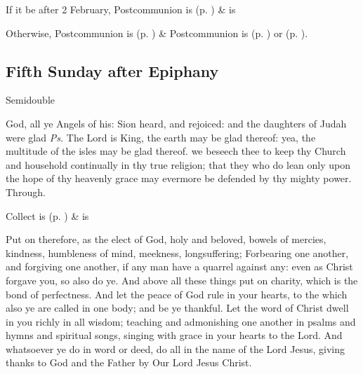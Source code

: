 
\begin{rubric}
    If it be after 2 February,  Postcommunion is  (p. \pageref{SPSaints}) \&  is 
\end{rubric}
\begin{rubric}
	Otherwise,  Postcommunion is  (p. \pageref{SPMaryPostChristmas}) \&  Postcommunion is  (p. \pageref{SPAgainst}) or  (p. \pageref{SPChiefBishop}).
\end{rubric}


\subsection{Fifth Sunday after Epiphany}\label{EpiphanyV}
\begin{inhead}
{Semidouble}
\end{inhead}


\introit
{} God, all ye Angels of his: Sion heard, and rejoiced: and the daughters of Judah were glad \textit{Ps.} The Lord is King, the earth may be glad thereof: yea, the multitude of the isles may be glad thereof.
\collect\label{EpiphanyVCollect}
 we beseech thee to keep thy Church and household continually in thy true religion; that they who do lean only upon the hope of thy heavenly grace may evermore be defended by thy mighty power. Through.
\begin{rubric}
     Collect is  (p. \pageref{SPSaints}) \&  is 
\end{rubric}
 Put on therefore, as the elect of God, holy and beloved, bowels of mercies, kindness, humbleness of mind, meekness, longsuffering; Forbearing one another, and forgiving one another, if any man have a quarrel against any: even as Christ forgave you, so also do ye. And above all these things put on charity, which is the bond of perfectness. And let the peace of God rule in your hearts, to the which also ye are called in one body; and be ye thankful. Let the word of Christ dwell in you richly in all wisdom; teaching and admonishing one another in psalms and hymns and spiritual songs, singing with grace in your hearts to the Lord. And whatsoever ye do in word or deed, do all in the name of the Lord Jesus, giving thanks to God and the Father by Our Lord Jesus Christ.

